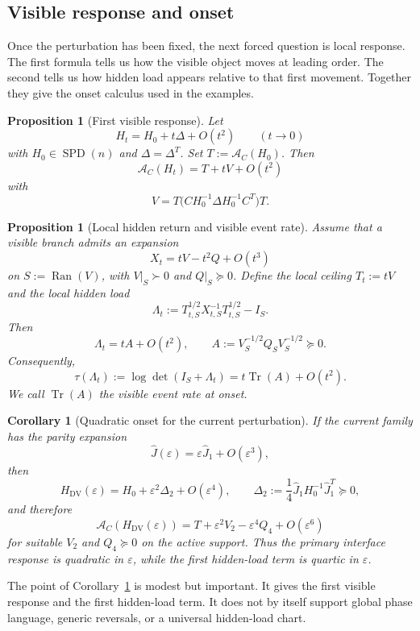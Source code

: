 \documentclass[11pt,a4paper]{article}
\numberwithin{equation}{section}
\DeclareMathOperator{\Tr}{Tr}
\DeclareMathOperator{\Ran}{Ran}
\DeclareMathOperator{\SPD}{SPD}
\newcommand{\Aobs}{\mathcal A}
\newcommand{\eps}{\varepsilon}
\theoremstyle{thmcompact}
\newtheorem{proposition}[theorem]{Proposition}
\newtheorem{corollary}[theorem]{Corollary}
\theoremstyle{remark}
\begin{document}
\subsection{Visible response and onset}

Once the perturbation has been fixed, the next forced question is local response. The first formula tells us how the visible object moves at leading order. The second tells us how hidden load appears relative to that first movement. Together they give the onset calculus used in the examples.

\begin{proposition}[First visible response]
\label{prop:first-response}
Let
\[
H_t=H_0+t\Delta+O(t^2)
\qquad (t\to 0)
\]
with \(H_0\in\SPD(n)\) and \(\Delta=\Delta^T\). Set \(T:=\Aobs_C(H_0)\). Then
\[
\Aobs_C(H_t)=T+tV+O(t^2)
\]
with
\[
V=T\bigl(CH_0^{-1}\Delta H_0^{-1}C^T\bigr)T.
\]
\end{proposition}

\begin{proposition}[Local hidden return and visible event rate]
\label{prop:local-birth}
Assume that a visible branch admits an expansion
\[
X_t=tV-t^2Q+O(t^3)
\]
on \(S:=\Ran(V)\), with \(V|_S\succ0\) and \(Q|_S\succeq0\). Define the local ceiling \(T_t:=tV\) and the local hidden load
\[
\Lambda_t:=T_{t,S}^{1/2}X_{t,S}^{-1}T_{t,S}^{1/2}-I_S.
\]
Then
\[
\Lambda_t=tA+O(t^2),
\qquad
A:=V_S^{-1/2}Q_SV_S^{-1/2}\succeq0.
\]
Consequently,
\[
\tau(\Lambda_t):=\log\det(I_S+\Lambda_t)=t\Tr(A)+O(t^2).
\]
We call \(\Tr(A)\) the visible event rate at onset.
\end{proposition}

\begin{corollary}[Quadratic onset for the current perturbation]
\label{cor:quadratic-dv}
If the current family has the parity expansion
\[
\widehat J(\eps)=\eps \widehat J_1+O(\eps^3),
\]
then
\[
H_{\mathrm{DV}}(\eps)=H_0+\eps^2\Delta_2+O(\eps^4),
\qquad
\Delta_2:=\frac14 \widehat J_1H_0^{-1}\widehat J_1^T\succeq0,
\]
and therefore
\[
\Aobs_C(H_{\mathrm{DV}}(\eps))
=
T+\eps^2V_2-\eps^4Q_4+O(\eps^6)
\]
for suitable \(V_2\) and \(Q_4\succeq0\) on the active support. Thus the primary interface response is quadratic in \(\eps\), while the first hidden-load term is quartic in \(\eps\).
\end{corollary}

The point of Corollary~\ref{cor:quadratic-dv} is modest but important. It gives the first visible response and the first hidden-load term. It does not by itself support global phase language, generic reversals, or a universal hidden-load chart.
\end{document}
